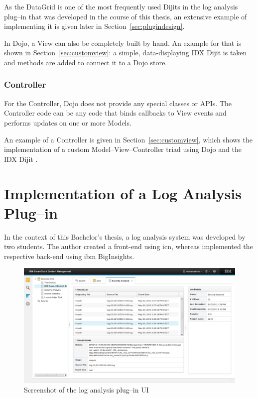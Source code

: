 As the DataGrid is one of the most frequently used Dijits in the log analysis plug--in that was developed in the course of this thesis, an extensive example of implementing it is given later in Section~\ref{sec:plugindesign}.

In Dojo, a View can also be completely built by hand. An example for that is shown in Section~\ref{sec:customview}: a simple, data-displaying IDX Dijit is taken and methods are added to connect it to a Dojo store.

\subsubsection*{Controller}
For the Controller, Dojo does not provide any special classes or APIs. The Controller code can be any code that binds callbacks to View events and performs updates on one or more Models.

An example of a Controller is given in Section~\ref{sec:customview}, which shows the implementation of a custom Model--View--Controller triad using Dojo and the IDX Dijit .
\newpage
\section{Implementation of a Log Analysis Plug--in}
\label{sec:loganal}
In the context of this Bachelor's thesis, a log analysis system was developed by two students. The author created a front-end using \acl{icn}, whereas  implemented the respective back-end using \ac{ibm} BigInsights.

\begin{figure}[H]
	\centering
	\includegraphics[width=16cm]{screens/job2.png}
	\caption{Screenshot of the log analysis plug--in UI}
	\label{fig:screenshot1}
\end{figure}

